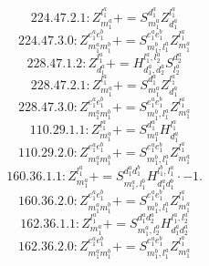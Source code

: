 \documentclass[letterpaper,10pt,fleqn,leqno,onecolumn]{article}
\begin{document}
\begin{equation} \;\;\;\;\;\;  224.47.2.1: Z^{l_{1}^{a}}_{m_{1}^{a}}+=S^{d_{1}^{a}}_{m_{1}^{a}}Z^{l_{1}^{a}}_{d_{1}^{a}} \end{equation}
\begin{equation} \;\;\;\;\;\;  224.47.3.0: Z^{e_{1}^{a}e_{1}^{b}}_{m_{1}^{a}m_{1}^{b}}+=S^{e_{1}^{a}e_{1}^{b}}_{m_{1}^{b},l_{1}^{a}}Z^{l_{1}^{a}}_{m_{1}^{a}} \end{equation}
\begin{equation} \;\;\;\;\;\;  228.47.1.2: Z^{l_{1}^{a}}_{d_{1}^{a}}+=H^{l_{1}^{a},l_{2}^{a}}_{d_{1}^{a},d_{2}^{a}}S^{d_{2}^{a}}_{l_{2}^{a}} \end{equation}
\begin{equation} \;\;\;\;\;\;  228.47.2.1: Z^{l_{1}^{a}}_{m_{1}^{a}}+=S^{d_{1}^{a}}_{m_{1}^{a}}Z^{l_{1}^{a}}_{d_{1}^{a}} \end{equation}
\begin{equation} \;\;\;\;\;\;  228.47.3.0: Z^{e_{1}^{a}e_{1}^{b}}_{m_{1}^{a}m_{1}^{b}}+=S^{e_{1}^{a}e_{1}^{b}}_{m_{1}^{b},l_{1}^{a}}Z^{l_{1}^{a}}_{m_{1}^{a}} \end{equation}
\begin{equation} \;\;\;\;\;\;  110.29.1.1: Z^{l_{1}^{a}}_{m_{1}^{a}}+=S^{d_{1}^{a}}_{m_{1}^{a}}H^{l_{1}^{a}}_{d_{1}^{a}} \end{equation}
\begin{equation} \;\;\;\;\;\;  110.29.2.0: Z^{e_{1}^{a}e_{1}^{b}}_{m_{1}^{a}m_{1}^{b}}+=S^{e_{1}^{a}e_{1}^{b}}_{m_{1}^{b},l_{1}^{a}}Z^{l_{1}^{a}}_{m_{1}^{a}} \end{equation}
\begin{equation} \;\;\;\;\;\;  160.36.1.1: Z^{l_{1}^{a}}_{m_{1}^{a}}+=S^{d_{1}^{a}d_{1}^{b}}_{m_{1}^{a},l_{1}^{b}}H^{l_{1}^{b},l_{1}^{a}}_{d_{1}^{a}d_{1}^{b}}\cdot -1. \end{equation}
\begin{equation} \;\;\;\;\;\;  160.36.2.0: Z^{e_{1}^{a}e_{1}^{b}}_{m_{1}^{a}m_{1}^{b}}+=S^{e_{1}^{a}e_{1}^{b}}_{m_{1}^{b},l_{1}^{a}}Z^{l_{1}^{a}}_{m_{1}^{a}} \end{equation}
\begin{equation} \;\;\;\;\;\;  162.36.1.1: Z^{l_{1}^{a}}_{m_{1}^{a}}+=S^{d_{1}^{a}d_{2}^{a}}_{m_{1}^{a},l_{2}^{a}}H^{l_{1}^{a},l_{2}^{a}}_{d_{1}^{a}d_{2}^{a}} \end{equation}
\begin{equation} \;\;\;\;\;\;  162.36.2.0: Z^{e_{1}^{a}e_{1}^{b}}_{m_{1}^{a}m_{1}^{b}}+=S^{e_{1}^{a}e_{1}^{b}}_{m_{1}^{b},l_{1}^{a}}Z^{l_{1}^{a}}_{m_{1}^{a}} \end{equation}
\end{document}
